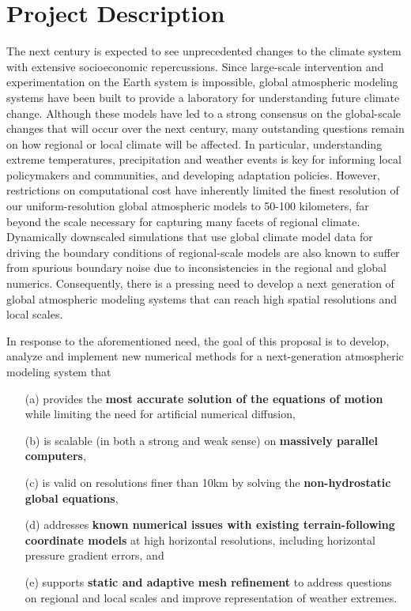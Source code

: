 \documentclass[11pt]{article}
\begin{document}
\appendix

\addtocounter{section}{3}
 
\section{Project Description}


The next century is expected to see unprecedented changes to the climate system with extensive socioeconomic repercussions.  Since large-scale intervention and experimentation on the Earth system is impossible, global atmospheric modeling systems have been built to provide a laboratory for understanding future climate change.  Although these models have led to a strong consensus on the global-scale changes that will occur over the next century, many outstanding questions remain on how regional or local climate will be affected.  In particular, understanding extreme temperatures, precipitation and weather events is key for informing local policymakers and communities, and developing adaptation policies.  However, restrictions on computational cost have inherently limited the finest resolution of our uniform-resolution global atmospheric models to 50-100 kilometers, far beyond the scale necessary for capturing many facets of regional climate.  Dynamically downscaled simulations that use global climate model data for driving the boundary conditions of regional-scale models are also known to suffer from spurious boundary noise due to inconsistencies in the regional and global numerics.  Consequently, there is a pressing need to develop a next generation of global atmospheric modeling systems that can reach high spatial resolutions and local scales.

In response to the aforementioned need, the goal of this proposal is to develop, analyze and implement new numerical methods for a next-generation atmospheric modeling system that
\vspace{-0.4cm}
\begin{enumerate}
\item[(a)] provides the \textbf{most accurate solution of the equations of motion} while limiting the need for artificial numerical diffusion,
\item[(b)] is scalable (in both a strong and weak sense) on \textbf{massively parallel computers},
\item[(c)] is valid on resolutions finer than 10km by solving the \textbf{non-hydrostatic global equations},
\item[(d)] addresses \textbf{known numerical issues with existing terrain-following coordinate models} at high horizontal resolutions, including horizontal pressure gradient errors, and
\item[(e)] supports \textbf{static and adaptive mesh refinement} to address questions on regional and local scales and improve representation of weather extremes.
\end{enumerate}
\end{document}
